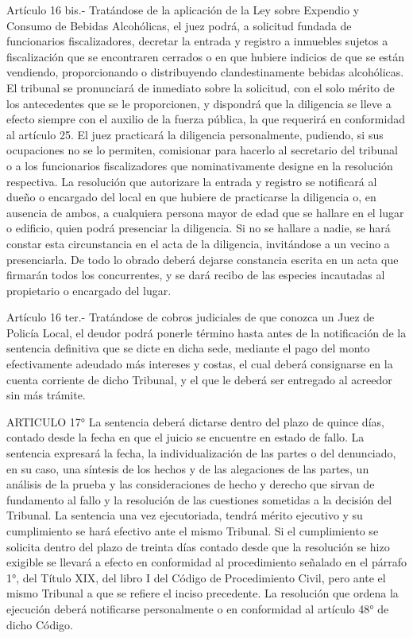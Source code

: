     Artículo 16 bis.- Tratándose de la aplicación de la Ley sobre Expendio y Consumo de Bebidas Alcohólicas, el juez podrá, a solicitud fundada de funcionarios fiscalizadores, decretar la entrada y registro a inmuebles sujetos a fiscalización que se encontraren cerrados o en que hubiere indicios de que se están vendiendo, proporcionando o distribuyendo clandestinamente bebidas alcohólicas.
    El tribunal se pronunciará de inmediato sobre la solicitud, con el solo mérito de los antecedentes que se le proporcionen, y dispondrá que la diligencia se lleve a efecto siempre con el auxilio de la fuerza pública, la que requerirá en conformidad al artículo 25.
    El juez practicará la diligencia personalmente, pudiendo, si sus ocupaciones no se lo permiten, comisionar para hacerlo al secretario del tribunal o a los funcionarios fiscalizadores que nominativamente designe en la resolución respectiva.
    La resolución que autorizare la entrada y registro se notificará al dueño o encargado del local en que hubiere de practicarse la diligencia o, en ausencia de ambos, a cualquiera persona mayor de edad que se hallare en el lugar o edificio, quien podrá presenciar la diligencia. Si no se hallare a nadie, se hará constar esta circunstancia en el acta de la diligencia, invitándose a un vecino a presenciarla.
    De todo lo obrado deberá dejarse constancia escrita en un acta que firmarán todos los concurrentes, y se dará recibo de las especies incautadas al propietario o encargado del lugar.

    Artículo 16 ter.- Tratándose de cobros judiciales de que conozca un Juez de Policía Local, el deudor podrá ponerle término hasta antes de la notificación de la sentencia definitiva que se dicte en dicha sede, mediante el pago del monto efectivamente adeudado más intereses y costas, el cual deberá consignarse en la cuenta corriente de dicho Tribunal, y el que le deberá ser entregado al acreedor sin más trámite.


    ARTICULO 17° La sentencia deberá dictarse dentro del plazo de quince días, contado desde la fecha en que el juicio se encuentre en estado de fallo.
    La sentencia expresará la fecha, la individualización de las partes o del denunciado, en su caso, una síntesis de los hechos y de las alegaciones de las partes, un análisis de la prueba y las consideraciones de hecho y derecho que sirvan de fundamento al fallo y la resolución de las cuestiones sometidas a la decisión del Tribunal.
    La sentencia una vez ejecutoriada, tendrá mérito ejecutivo y su cumplimiento se hará efectivo ante el mismo Tribunal.
    Si el cumplimiento se solicita dentro del plazo de treinta días contado desde que la resolución se hizo exigible se llevará a efecto en conformidad al procedimiento señalado en el párrafo 1°, del Título XIX, del libro I del Código de Procedimiento Civil, pero ante el mismo Tribunal a que se refiere el inciso precedente. La resolución que ordena la ejecución deberá notificarse personalmente o en conformidad al artículo 48° de dicho Código.

